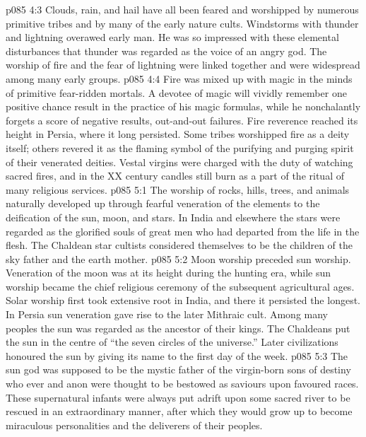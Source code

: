 \vs p085 4:3 Clouds, rain, and hail have all been feared and worshipped by numerous primitive tribes and by many of the early nature cults. Windstorms with thunder and lightning overawed early man. He was so impressed with these elemental disturbances that thunder was regarded as the voice of an angry god. The worship of fire and the fear of lightning were linked together and were widespread among many early groups.
\vs p085 4:4 Fire was mixed up with magic in the minds of primitive fear\hyp{}ridden mortals. A devotee of magic will vividly remember one positive chance result in the practice of his magic formulas, while he nonchalantly forgets a score of negative results, out\hyp{}and\hyp{}out failures. Fire reverence reached its height in Persia, where it long persisted. Some tribes worshipped fire as a deity itself; others revered it as the flaming symbol of the purifying and purging spirit of their venerated deities. Vestal virgins were charged with the duty of watching sacred fires, and in the XX century candles still burn as a part of the ritual of many religious services.
\vs p085 5:1 The worship of rocks, hills, trees, and animals naturally developed up through fearful veneration of the elements to the deification of the sun, moon, and stars. In India and elsewhere the stars were regarded as the glorified souls of great men who had departed from the life in the flesh. The Chaldean star cultists considered themselves to be the children of the sky father and the earth mother.
\vs p085 5:2 Moon worship preceded sun worship. Veneration of the moon was at its height during the hunting era, while sun worship became the chief religious ceremony of the subsequent agricultural ages. Solar worship first took extensive root in India, and there it persisted the longest. In Persia sun veneration gave rise to the later Mithraic cult. Among many peoples the sun was regarded as the ancestor of their kings. The Chaldeans put the sun in the centre of “the seven circles of the universe.” Later civilizations honoured the sun by giving its name to the first day of the week.
\vs p085 5:3 The sun god was supposed to be the mystic father of the virgin\hyp{}born sons of destiny who ever and anon were thought to be bestowed as saviours upon favoured races. These supernatural infants were always put adrift upon some sacred river to be rescued in an extraordinary manner, after which they would grow up to become miraculous personalities and the deliverers of their peoples.
